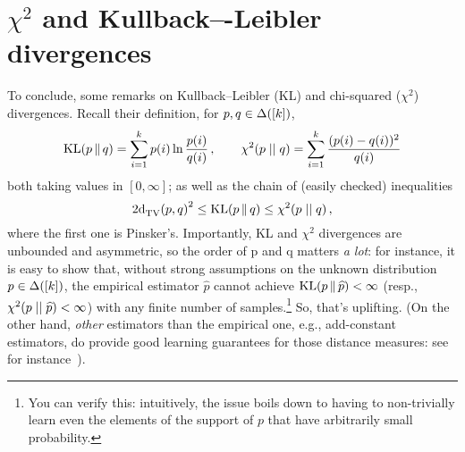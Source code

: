 \documentclass[10pt]{article}
\newcommand{\ab}{k}
\begin{document}
\section{$\chi^2$ and Kullback–-Leibler divergences}
To conclude, some remarks on Kullback--Leibler (KL) and chi-squared ($\chi^2$) divergences. Recall their definition, for $p,q\in\distribs{[\ab]}$,
\[
    \kldiv{p}{q} = \sum_{i=1}^\ab p(i) \ln \frac{p(i)}{q(i)}\,,\qquad \chisquare{p}{q} = \sum_{i=1}^\ab \frac{(p(i)-q(i))^2}{q(i)}
\]
both taking values in $[0,\infty]$; as well as the chain of (easily checked) inequalities
\[
    2\totalvardist{p}{q}^2 \leq \kldiv{p}{q} %
    \leq \chisquare{p}{q}\,,
\]
where the first one is Pinsker's. Importantly, KL and $\chi^2$ divergences are unbounded and asymmetric, so
the order of p and q matters \emph{a lot}: for instance, it is easy to show that, without strong assumptions on the
unknown distribution $p\in\distribs{[\ab]}$, the empirical estimator $\widehat{p}$ cannot achieve $\kldiv{p}{\widehat{p}} < \infty$ (resp., $\chisquare{p}{\widehat{p}} < \infty$) with any finite number of samples.\footnote{You can verify this: intuitively, the issue boils down to having to non-trivially learn even the elements of the support of $p$ that have arbitrarily small probability.}{} So, that's uplifting. (On the other hand, \emph{other} estimators than the empirical one, e.g., add-constant estimators, do provide good learning guarantees for those distance measures: see for instance~\cite{Kamath:15}).\smallskip
\end{document}
